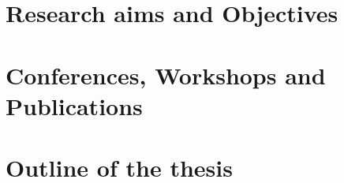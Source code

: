 \section{Research aims and Objectives}
\label{intro:research_aims}

\section{Conferences, Workshops and Publications}
\label{intro:papers}

\section{Outline of the thesis}
\label{intro:outline}

